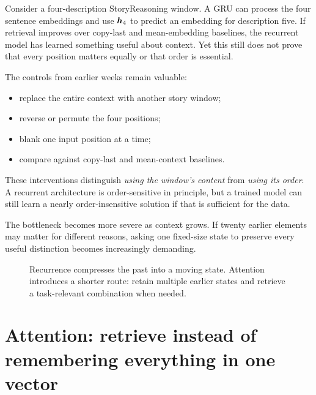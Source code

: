 Consider a four-description StoryReasoning window. A GRU can process the four sentence embeddings and use \(\bm{h}_4\) to predict an embedding for description five. If retrieval improves over copy-last and mean-embedding baselines, the recurrent model has learned something useful about context. Yet this still does not prove that every position matters equally or that order is essential.

The controls from earlier weeks remain valuable:
\begin{itemize}[leftmargin=*]
  \item replace the entire context with another story window;
  \item reverse or permute the four positions;
  \item blank one input position at a time;
  \item compare against copy-last and mean-context baselines.
\end{itemize}

These interventions distinguish \emph{using the window's content} from \emph{using its order}. A recurrent architecture is order-sensitive in principle, but a trained model can still learn a nearly order-insensitive solution if that is sufficient for the data.

The bottleneck becomes more severe as context grows. If twenty earlier elements may matter for different reasons, asking one fixed-size state to preserve every useful distinction becomes increasingly demanding.

\begin{figure}[ht]
  \caption{Recurrence compresses the past into a moving state. Attention introduces a shorter route: retain multiple earlier states and retrieve a task-relevant combination when needed.}
  \label{fig:week7-attention-motivation}
\end{figure}

\section{Attention: retrieve instead of remembering everything in one vector}

